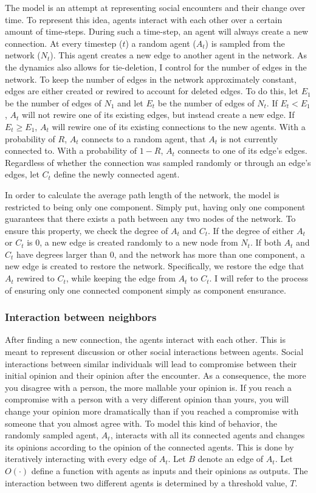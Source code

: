 \documentclass{article}
\begin{document}
The model is an attempt at representing social encounters and their change over time. 
To represent this idea, agents interact with each other over a certain amount of time-steps. 
During such a time-step, an agent will always create a new connection. 
At every timestep ($t$) a random agent ($A_t$) is sampled from the network ($N_t$). This agent creates a new edge to another agent in the network. 
As the dynamics also allows for tie-deletion, I control for the number of edges in the network.
To keep the number of edges in the network approximately constant, edges are either created or rewired to account for deleted edges. 
To do this, let $E_1$ be the number of edges of $N_1$ and let $E_t$ be the number of edges of $N_t$. 
If $E_t < E_1$, $A_t$ will not rewire one of its existing edges, but instead create a new edge. If $E_t \geq E_1$, $A_t$ will rewire one of its existing connections to the new agents.
With a probability of $R$, $A_t$ connects to a random agent, that $A_t$ is not currently connected to. 
With a probability of $1-R$, $A_t$ connects to one of its edge's edges. Regardless of whether the connection was sampled randomly or through an edge's edges, let $C_t$ define the newly connected agent.

In order to calculate the average path length of the network, the model is restricted to being only one component. 
Simply put, having only one component guarantees that there exists a path between any two nodes of the network.
To ensure this property, we check the degree of $A_t$ and $C_t$. If the degree of either $A_t$ or $C_t$ is 0, a new edge is created randomly to a new node from $N_t$.
If both $A_t$ and $C_t$ have degrees larger than 0, and the network has more than one component, a new edge is created to restore the network. Specifically, we restore the edge that $A_t$ rewired to $C_t$, while keeping the edge from $A_t$ to $C_t$.
I will refer to the process of ensuring only one connected component simply as component ensurance. 

\subsubsection{Interaction between neighbors}
After finding a new connection, the agents interact with each other. This is meant to represent 
discussion or other social interactions between agents. 
Social interactions between similar individuals will lead to compromise between their initial opinion and their opinion after the encounter.
As a consequence, the more you disagree with a person, the more mallable your opinion is. If you reach a compromise with a person with a very different opinion than yours,
you will change your opinion more dramatically than if you reached a compromise with someone that you almost agree with. 
To model this kind of behavior, the randomly sampled agent, $A_t$, interacts with all its connected agents and changes its opinions according to the opinion of the connected agents.
This is done by iteratively interacting with every edge of $A_t$. Let $B$ denote an edge of $A_t$. Let $O(\cdot)$ define a function with agents as inputs and their opinions as outputs.
The interaction between two different agents is determined by a threshold value, $T$. 
\end{document}
